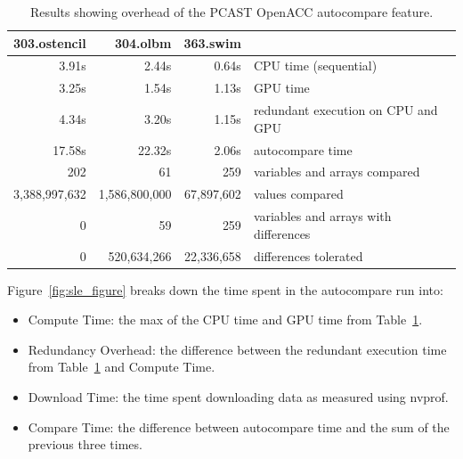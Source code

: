 \begin{table}
\begin{center}
\begin{tabular}{rrrl}
\hline
303.ostencil & 304.olbm & 363.swim & \\
\hline
 3.91s &  2.44s & 0.64s & CPU time (sequential) \\
 3.25s &  1.54s & 1.13s & GPU time \\
 4.34s &  3.20s & 1.15s & redundant execution on CPU and GPU \\
17.58s & 22.32s & 2.06s & autocompare time \\
   202 &     61 &   259 & variables and arrays compared \\
3,388,997,632 & 1,586,800,000 & 67,897,602 & values compared \\
   0   &     59 &   259 & variables and arrays with differences \\
            0 &   520,634,266 & 22,336,658 & differences tolerated \\
\hline
\end{tabular}
\end{center}
\caption{Results showing overhead of the PCAST OpenACC autocompare feature.}
\label{res1}
\end{table}

Figure~\ref{fig:sle_figure} breaks down the time spent in the autocompare run into:
\begin{itemize}
\item Compute Time: the max of the CPU time and GPU time from Table~\ref{res1}.
\item Redundancy Overhead: the difference between the redundant execution time from Table~\ref{res1} and Compute Time.
\item Download Time: the time spent downloading data as measured using nvprof.
\item Compare Time: the difference between autocompare time and the sum of the previous three times.
\end{itemize}


